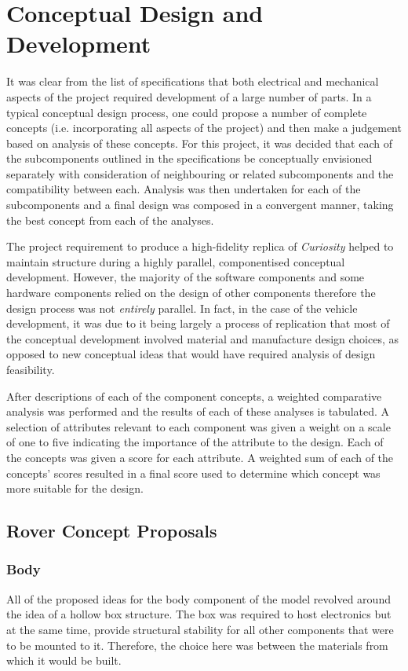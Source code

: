 \section{Conceptual Design and Development}
\label{sec:conceptualDesign}
  It was clear from the list of specifications that both electrical and mechanical aspects of the project required development of a large number of parts. In a typical conceptual design process, one could propose a number of complete concepts (i.e. incorporating all aspects of the project) and then make a judgement based on analysis of these concepts. For this project, it was decided that each of the subcomponents outlined in the specifications be conceptually envisioned separately with consideration of neighbouring or related subcomponents and the compatibility between each. Analysis was then undertaken for each of the subcomponents and a final design was composed in a convergent manner, taking the best concept from each of the analyses.
  
  The project requirement to produce a high-fidelity replica of \textit{Curiosity} helped to maintain structure during a highly parallel, componentised conceptual development. However, the majority of the software components and some hardware components relied on the design of other components therefore the design process was not \textit{entirely} parallel. In fact, in the case of the vehicle development, it was due to it being largely a process of replication that most of the conceptual development involved material and manufacture design choices, as opposed to new conceptual ideas that would have required analysis of design feasibility.
  
  After descriptions of each of the component concepts, a weighted comparative analysis was performed and the results of each of these analyses is tabulated. A selection of attributes relevant to each component was given a weight on a scale of one to five indicating the importance of the attribute to the design. Each of the concepts was given a score for each attribute. A weighted sum of each of the concepts' scores resulted in a final score used to determine which concept was more suitable for the design.
  
  \subsection{Rover Concept Proposals}
  \label{subsec:rover-concept-proposals}    
    \subsubsection{Body}
      All of the proposed ideas for the body component of the model revolved around the idea of a hollow box structure. The box was required to host electronics but at the same time, provide structural stability for all other components that were to be mounted to it. Therefore, the choice here was between the materials from which it would be built.
      

